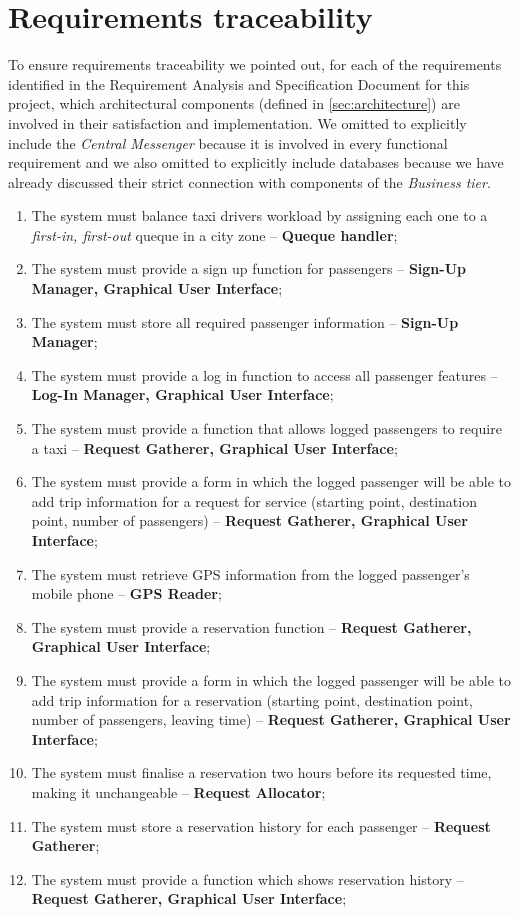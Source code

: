 \chapter{Requirements traceability}

To ensure requirements traceability we pointed out, for each of the requirements identified in the Requirement Analysis and Specification Document for this project, which architectural components (defined in \autoref{sec:architecture}) are involved in their satisfaction and implementation.
We omitted to explicitly include the \emph{Central Messenger} because it is involved in every functional requirement and we also omitted to explicitly include databases because we have already discussed their strict connection with components of the \emph{Business tier}.

\begin{enumerate}

\item The system must balance taxi drivers workload by assigning each one to a \emph{first-in, first-out} queque in a city zone -- \textbf{Queque handler};

\item The system must provide a sign up function for passengers -- \textbf{Sign-Up Manager, Graphical User Interface};
\item The system must store all required passenger information -- \textbf{Sign-Up Manager};

\item The system must provide a log in function to access all passenger features -- \textbf{Log-In Manager, Graphical User Interface};

\item The system must provide a function that allows logged passengers to require a taxi -- \textbf{Request Gatherer, Graphical User Interface};
\item The system must provide a form in which the logged passenger will be able to add trip information for a request for service (starting point, destination point, number of passengers) -- \textbf{Request Gatherer, Graphical User Interface};
\item The system must retrieve GPS information from the logged passenger's mobile phone -- \textbf{GPS Reader};

\item The system must provide a reservation function -- \textbf{Request Gatherer, Graphical User Interface};
\item The system must provide a form in which the logged passenger will be able to add trip information for a reservation (starting point, destination point, number of passengers, leaving time) -- \textbf{Request Gatherer, Graphical User Interface};
\item The system must finalise a reservation two hours before its requested time, making it unchangeable -- \textbf{Request Allocator};
\item The system must store a reservation history for each passenger -- \textbf{Request Gatherer};
\item The system must provide a function which shows reservation history -- \textbf{Request Gatherer, Graphical User Interface};


\end{enumerate}
